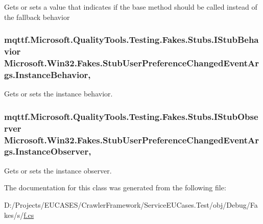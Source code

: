 Gets or sets a value that indicates if the base method should be called instead of the fallback behavior

\hypertarget{class_microsoft_1_1_win32_1_1_fakes_1_1_stub_user_preference_changed_event_args_a0b6219be92f0e62138280e5881db3caf}{
\subsubsection[{Instance\-Behavior}]{\setlength{\rightskip}{0pt plus 5cm}mqttf.\-Microsoft.\-Quality\-Tools.\-Testing.\-Fakes.\-Stubs.\-I\-Stub\-Behavior Microsoft.\-Win32.\-Fakes.\-Stub\-User\-Preference\-Changed\-Event\-Args.\-Instance\-Behavior\hspace{0.3cm}{\ttfamily [get]}, {\ttfamily [set]}}}\label{class_microsoft_1_1_win32_1_1_fakes_1_1_stub_user_preference_changed_event_args_a0b6219be92f0e62138280e5881db3caf}


Gets or sets the instance behavior.

\hypertarget{class_microsoft_1_1_win32_1_1_fakes_1_1_stub_user_preference_changed_event_args_ac230d55b956ebd7bee80eec84f5649a5}{
\subsubsection[{Instance\-Observer}]{\setlength{\rightskip}{0pt plus 5cm}mqttf.\-Microsoft.\-Quality\-Tools.\-Testing.\-Fakes.\-Stubs.\-I\-Stub\-Observer Microsoft.\-Win32.\-Fakes.\-Stub\-User\-Preference\-Changed\-Event\-Args.\-Instance\-Observer\hspace{0.3cm}{\ttfamily [get]}, {\ttfamily [set]}}}\label{class_microsoft_1_1_win32_1_1_fakes_1_1_stub_user_preference_changed_event_args_ac230d55b956ebd7bee80eec84f5649a5}


Gets or sets the instance observer.



The documentation for this class was generated from the following file\-:\begin{DoxyCompactItemize}
\item 
D\-:/\-Projects/\-E\-U\-C\-A\-S\-E\-S/\-Crawler\-Framework/\-Service\-E\-U\-Cases.\-Test/obj/\-Debug/\-Fakes/s/\hyperlink{s_2f_8cs}{f.\-cs}\end{DoxyCompactItemize}
